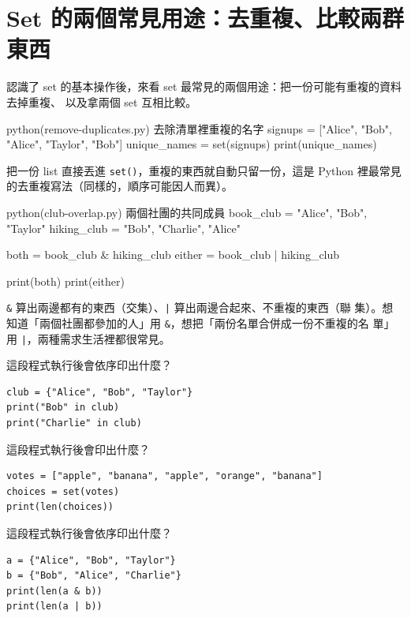 \section{Set 的兩個常見用途：去重複、比較兩群東西}
\label{sec:set-ops}

認識了 set 的基本操作後，來看 set 最常見的兩個用途：把一份可能有重複的資料去掉重複、
以及拿兩個 set 互相比較。

\begin{example}{python}{(remove-duplicates.py) 去除清單裡重複的名字}
signups = ["Alice", "Bob", "Alice", "Taylor", "Bob"]
unique_names = set(signups)
print(unique_names)
\end{example}


把一份 list 直接丟進 \texttt{set()}，重複的東西就自動只留一份，這是 Python 裡最常見
的去重複寫法（同樣的，順序可能因人而異）。

\begin{example}{python}{(club-overlap.py) 兩個社團的共同成員}
book_club = {"Alice", "Bob", "Taylor"}
hiking_club = {"Bob", "Charlie", "Alice"}

both = book_club & hiking_club
either = book_club | hiking_club

print(both)
print(either)
\end{example}


\texttt{\&} 算出兩邊都有的東西（交集）、\texttt{|} 算出兩邊合起來、不重複的東西（聯
集）。想知道「兩個社團都參加的人」用 \texttt{\&}，想把「兩份名單合併成一份不重複的名
單」用 \texttt{|}，兩種需求生活裡都很常見。

\begin{drills}[label=drills:set-ops]
\item 這段程式執行後會依序印出什麼？
\begin{verbatim}
club = {"Alice", "Bob", "Taylor"}
print("Bob" in club)
print("Charlie" in club)
\end{verbatim}
\item 這段程式執行後會印出什麼？
\begin{verbatim}
votes = ["apple", "banana", "apple", "orange", "banana"]
choices = set(votes)
print(len(choices))
\end{verbatim}
\item 這段程式執行後會依序印出什麼？
\begin{verbatim}
a = {"Alice", "Bob", "Taylor"}
b = {"Bob", "Alice", "Charlie"}
print(len(a & b))
print(len(a | b))
\end{verbatim}
\end{drills}

